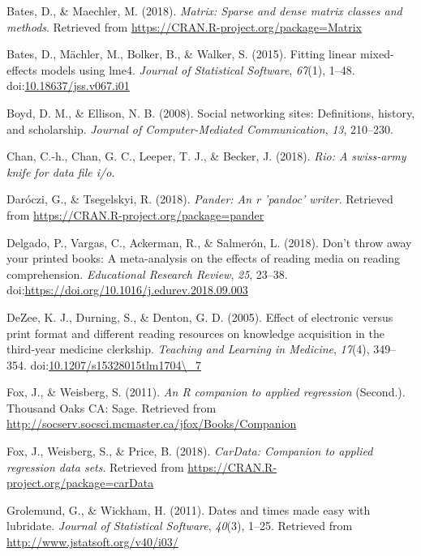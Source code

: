 \documentclass[man, fleqn, noextraspace]{apa6}
\theoremstyle{definition}
\theoremstyle{definition}
\theoremstyle{definition}
\theoremstyle{remark}
\begin{document}
\hypertarget{ref-R-Matrix}{}
Bates, D., \& Maechler, M. (2018). \emph{Matrix: Sparse and dense matrix
classes and methods}. Retrieved from
\url{https://CRAN.R-project.org/package=Matrix}

\hypertarget{ref-R-lme4}{}
Bates, D., Mächler, M., Bolker, B., \& Walker, S. (2015). Fitting linear
mixed-effects models using lme4. \emph{Journal of Statistical Software},
\emph{67}(1), 1--48.
doi:\href{https://doi.org/10.18637/jss.v067.i01}{10.18637/jss.v067.i01}

\hypertarget{ref-Boyd2008}{}
Boyd, D. M., \& Ellison, N. B. (2008). Social networking sites:
Definitions, history, and scholarship. \emph{Journal of
Computer-Mediated Communication}, \emph{13}, 210--230.

\hypertarget{ref-R-rio}{}
Chan, C.-h., Chan, G. C., Leeper, T. J., \& Becker, J. (2018).
\emph{Rio: A swiss-army knife for data file i/o}.

\hypertarget{ref-R-pander}{}
Daróczi, G., \& Tsegelskyi, R. (2018). \emph{Pander: An r 'pandoc'
writer}. Retrieved from \url{https://CRAN.R-project.org/package=pander}

\hypertarget{ref-Delgado2018}{}
Delgado, P., Vargas, C., Ackerman, R., \& Salmerón, L. (2018). Don't
throw away your printed books: A meta-analysis on the effects of reading
media on reading comprehension. \emph{Educational Research Review},
\emph{25}, 23--38.
doi:\href{https://doi.org/https://doi.org/10.1016/j.edurev.2018.09.003}{https://doi.org/10.1016/j.edurev.2018.09.003}

\hypertarget{ref-DeZee2005}{}
DeZee, K. J., Durning, S., \& Denton, G. D. (2005). Effect of electronic
versus print format and different reading resources on knowledge
acquisition in the third-year medicine clerkship. \emph{Teaching and
Learning in Medicine}, \emph{17}(4), 349--354.
doi:\href{https://doi.org/10.1207/s15328015tlm1704/_7}{10.1207/s15328015tlm1704\textbackslash{}\_7}

\hypertarget{ref-R-car}{}
Fox, J., \& Weisberg, S. (2011). \emph{An R companion to applied
regression} (Second.). Thousand Oaks CA: Sage. Retrieved from
\url{http://socserv.socsci.mcmaster.ca/jfox/Books/Companion}

\hypertarget{ref-R-carData}{}
Fox, J., Weisberg, S., \& Price, B. (2018). \emph{CarData: Companion to
applied regression data sets}. Retrieved from
\url{https://CRAN.R-project.org/package=carData}

\hypertarget{ref-R-lubridate}{}
Grolemund, G., \& Wickham, H. (2011). Dates and times made easy with
lubridate. \emph{Journal of Statistical Software}, \emph{40}(3), 1--25.
Retrieved from \url{http://www.jstatsoft.org/v40/i03/}
\end{document}
